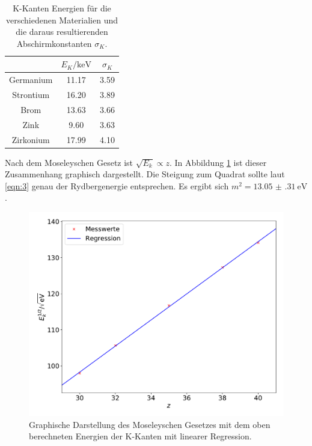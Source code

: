 \begin{table}
  \centering
  \caption{K-Kanten Energien für die verschiedenen Materialien und die daraus resultierenden
  Abschirmkonstanten $\sigma_K$.}
  \label{tab:7}
  \begin{tabular}{c c c}
    \toprule
    & $E_K / \si{\kilo\electronvolt}$ & $\sigma_K$ \\
    \midrule
    Germanium & 11.17 & 3.59 \\
    Strontium & 16.20 & 3.89 \\
    Brom & 13.63 & 3.66 \\
    Zink & 9.60 & 3.63 \\
    Zirkonium & 17.99 & 4.10 \\
    \bottomrule
  \end{tabular}
\end{table}
Nach dem Moseleyschen Gesetz ist $\sqrt{E_k} \propto z$. In Abbildung \ref{fig:8}
ist dieser Zusammenhang graphisch dargestellt. Die Steigung zum Quadrat sollte laut
\eqref{eqn:3} genau der Rydbergenergie entsprechen. Es ergibt sich $m^2 = \SI{13.05(31)}{\electronvolt}$.
\begin{figure}
  \centering
  \includegraphics[scale=0.3]{moseley.pdf}
  \caption{Graphische Darstellung des Moseleyschen Gesetzes mit dem oben berechneten
  Energien der K-Kanten mit linearer Regression.}
  \label{fig:8}
\end{figure}

